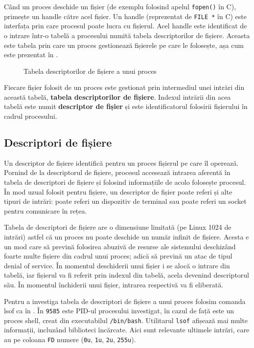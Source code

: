 Când un proces deschide un fișier (de exemplu folosind apelul \texttt{fopen()} în C),
primește un handle către acel fișier. Un handle (reprezentat de \texttt{FILE *} în C)
este interfața prin care procesul poate lucra cu fișierul. Acel handle este
identificat de o intrare într-o tabelă a procesului numită tabela descriptorilor
de fișiere. Aceasta este tabela prin care un proces gestionează fișierele pe
care le folosește, așa cum este prezentat în .

\begin{figure}[!htbp]
	\centering
	\def\svgwidth{0.8\textwidth}
	
	\caption{Tabela descriptorilor de fișiere a unui proces}
	\label{fig:process-fdtab}
\end{figure}

Fiecare fișier folosit de un proces este gestionat prin intermediul unei intrări
din această tabelă, \textbf{tabela descriptorilor de fișiere}. Indexul intrării din acea
tabelă este numit \textbf{descriptor de fișier} și este identificatorul folosirii
fișierului în cadrul procesului.

\subsection{Descriptori de fișiere}
\label{sec:process-fisiere-description}

Un descriptor de fișiere identifică pentru un proces fișierul pe care îl
operează. Pornind de la descriptorul de fișiere, procesul accesează intrarea
aferentă în tabela de descriptori de fișiere și folosind informațiile de acolo
folosește procesul. În mod uzual folosit pentru fișiere, un descriptor de fișier
poate referi și alte tipuri de intrări: poate referi un dispozitiv de terminal
sau poate referi un socket pentru comunicare în rețea.

Tabela de descriptori de fișiere are o dimensiune limitată (pe Linux 1024 de
intrări) astfel că un proces nu poate deschide un număr infinit de fișiere.
Acesta e un mod care să prevină folosirea abuzivă de resurse ale sistemului
deschizând foarte multe fișiere din cadrul unui proces; adică să prevină un atac
de tipul denial of service. În momentul deschiderii unui fișier i se alocă o
intrare din tabelă, iar fișierul va fi referit prin indexul din tabelă, acela
devenind descriptorul său. În momentul închiderii unui fișier, intrarea
respectivă va fi eliberată.

Pentru a investiga tabela de descriptori de fișiere a unui proces folosim
comanda lsof ca în .
În  \texttt{9585} este PID-ul procesului investigat, în cazul de față este un proces shell, creat din executabilul \texttt{/bin/bash}. Utilitarul \texttt{lsof} afișează mai multe informații, incluzând biblioteci încărcate. Aici sunt relevante ultimele intrări, care au pe coloana \texttt{FD} numere (\texttt{0u}, \texttt{1u}, \texttt{2u}, \texttt{255u}).

